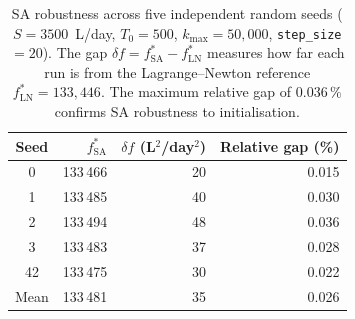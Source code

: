 \vspace{0.5cm}
{\captionsetup{justification=raggedright,singlelinecheck=false}

}



\begin{table}[h]
\centering
\small
\caption{SA robustness across five independent random seeds
($S=3500$~L/day, $T_0=500$, $k_{\max}=50{,}000$, \texttt{step\_size}$=20$).
The gap $\delta f = f_{\text{SA}}^* - f_{\text{LN}}^*$ measures how far
each run is from the Lagrange--Newton reference $f_{\text{LN}}^* = 133{,}446$.
The maximum relative gap of $0.036\,\%$ confirms SA robustness to initialisation.}
\label{tab:robustness}
\begin{tabular}{@{}crrr@{}}
\toprule
Seed & $f_{\text{SA}}^*$ & $\delta f$ (L$^2$/day$^2$) & Relative gap (\%) \\ \midrule
 0  & 133\,466 & 20  & 0.015 \\
 1  & 133\,485 & 40  & 0.030 \\
 2  & 133\,494 & 48  & 0.036 \\
 3  & 133\,483 & 37  & 0.028 \\
42  & 133\,475 & 30  & 0.022 \\
\midrule
Mean & 133\,481 & 35 & 0.026 \\
\bottomrule
\end{tabular}
\end{table}

